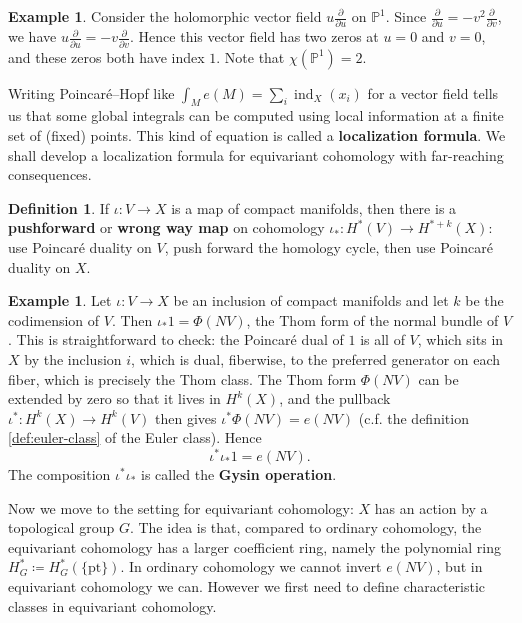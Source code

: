 \documentclass{report}
\theoremstyle{plain}
\theoremstyle{definition}
\newtheorem{definition}[theorem]{Definition}
\newtheorem{example}[theorem]{Example}
\theoremstyle{remark}
\newcommand{\bP}{\mathbb{P}}
\DeclareMathOperator{\ind}{ind}
\newcommand{\pt}{\mathrm{pt}}
\newcommand{\pder}[2]{\frac{\partial #1}{\partial #2}}
\begin{document}
\begin{example}
  Consider the holomorphic vector field $u \pder{}{u}$ on $\bP^1$.
  Since $\pder{}{u} = -v^2 \pder{}{v}$, we have $u \pder{}{u} = -v
  \pder{}{v}$. Hence this vector field has two zeros at $u = 0$ and $v
  = 0$, and these zeros both have index $1$. Note that $\chi(\bP^1) =
  2$.
\end{example}

Writing Poincar\'e--Hopf like $\int_M e(M) = \sum_i \ind_X(x_i)$ for a
vector field tells us that some global integrals can be computed using
local information at a finite set of (fixed) points. This kind of
equation is called a {\bf localization formula}. We shall develop a
localization formula for equivariant cohomology with far-reaching
consequences.

\begin{definition}
  If $\iota\colon V \to X$ is a map of compact manifolds, then there
  is a {\bf pushforward} or {\bf wrong way map} on cohomology
  $\iota_*\colon H^*(V) \to H^{*+k}(X)$: use Poincar\'e duality on
  $V$, push forward the homology cycle, then use Poincar\'e duality on
  $X$.
\end{definition}

\begin{example}
  Let $\iota\colon V \to X$ be an inclusion of compact manifolds and
  let $k$ be the codimension of $V$. Then $\iota_*1 = \Phi(NV)$, the
  Thom form of the normal bundle of $V$. This is straightforward to
  check: the Poincar\'e dual of $1$ is all of $V$, which sits in $X$
  by the inclusion $i$, which is dual, fiberwise, to the preferred
  generator on each fiber, which is precisely the Thom class. The Thom
  form $\Phi(NV)$ can be extended by zero so that it lives in
  $H^k(X)$, and the pullback $\iota^*\colon H^k(X) \to H^k(V)$ then
  gives $\iota^*\Phi(NV) = e(NV)$ (c.f. the definition
  \ref{def:euler-class} of the Euler class). Hence
  \[ \iota^* \iota_* 1 = e(NV). \]
  The composition $\iota^*\iota_*$ is called the {\bf Gysin operation}.
\end{example}

Now we move to the setting for equivariant cohomology: $X$ has an
action by a topological group $G$. The idea is that, compared to
ordinary cohomology, the equivariant cohomology has a larger
coefficient ring, namely the polynomial ring $H^*_G \coloneqq
H^*_G(\{\pt\})$. In ordinary cohomology we cannot invert $e(NV)$, but
in equivariant cohomology we can. However we first need to define
characteristic classes in equivariant cohomology.
\end{document}
